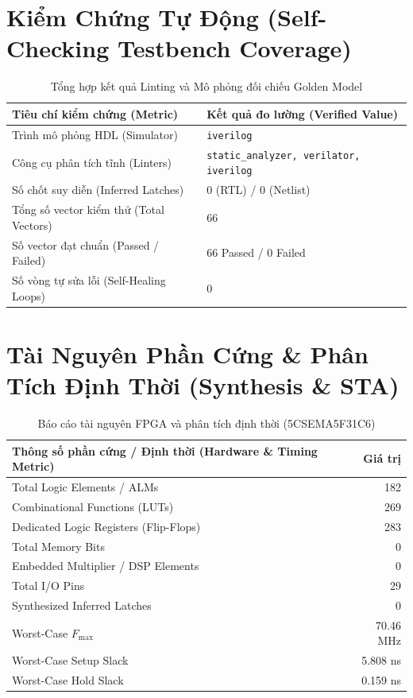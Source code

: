 \documentclass[11pt,a4paper]{article}
\begin{document}
\section{Kiểm Chứng Tự Động (Self-Checking Testbench Coverage)}
\begin{table}[H]
    \centering
    \small
    \caption{Tổng hợp kết quả Linting và Mô phỏng đối chiếu Golden Model}
    \begin{tabularx}{\textwidth}{@{}lX@{}}
        \toprule
        \textbf{Tiêu chí kiểm chứng (Metric)} & \textbf{Kết quả đo lường (Verified Value)} \\
        \midrule
        Trình mô phỏng HDL (Simulator) & \texttt{iverilog} \\
        Công cụ phân tích tĩnh (Linters) & \texttt{static\_analyzer, verilator, iverilog} \\
        Số chốt suy diễn (Inferred Latches) & 0 (RTL) / 0 (Netlist) \\
        Tổng số vector kiểm thử (Total Vectors) & 66 \\
        Số vector đạt chuẩn (Passed / Failed) & 66 Passed / 0 Failed \\
        Số vòng tự sửa lỗi (Self-Healing Loops) & 0 \\
        \bottomrule
    \end{tabularx}
\end{table}

\section{Tài Nguyên Phần Cứng \& Phân Tích Định Thời (Synthesis \& STA)}
\begin{table}[H]
    \centering
    \small
    \caption{Báo cáo tài nguyên FPGA và phân tích định thời (5CSEMA5F31C6)}
    \begin{tabularx}{\textwidth}{@{}Xr@{}}
        \toprule
        \textbf{Thông số phần cứng / Định thời (Hardware \& Timing Metric)} & \textbf{Giá trị} \\
        \midrule
        Total Logic Elements / ALMs & 182 \\
        Combinational Functions (LUTs) & 269 \\
        Dedicated Logic Registers (Flip-Flops) & 283 \\
        Total Memory Bits & 0 \\
        Embedded Multiplier / DSP Elements & 0 \\
        Total I/O Pins & 29 \\
        Synthesized Inferred Latches & 0 \\
        Worst-Case $F_{\max}$ & 70.46 MHz \\
        Worst-Case Setup Slack & 5.808 ns \\
        Worst-Case Hold Slack & 0.159 ns \\
        \bottomrule
    \end{tabularx}
\end{table}
\end{document}
